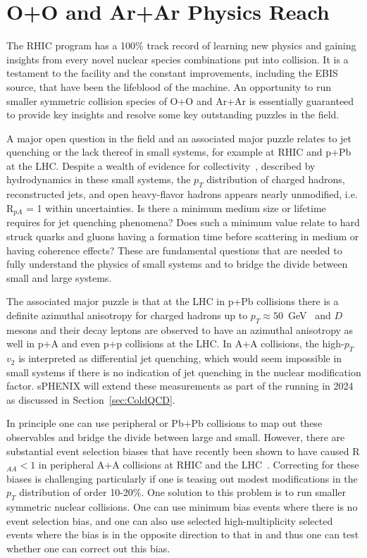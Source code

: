 \FloatBarrier

\section{O+O and Ar+Ar Physics Reach}

The RHIC program has a 100\% track record of learning new physics and gaining insights from every novel nuclear species combinations put into collision.    It is a testament to the facility and the constant improvements, including the EBIS source, that have been the lifeblood of the machine.    An opportunity to run smaller symmetric collision species of O+O and Ar+Ar is essentially guaranteed to provide key insights and resolve some key outstanding puzzles in the field.  

A major open question in the field and an associated major puzzle relates to jet quenching or the lack thereof in small systems, for example \pau at RHIC and p+Pb at the LHC.    Despite a wealth of evidence for collectivity~\cite{Nagle:2018nvi}, described by hydrodynamics in these small systems, the $p_{T}$ distribution of charged hadrons, reconstructed jets, and open heavy-flavor hadrons appears nearly unmodified, i.e. R$_{pA}$ = 1 within uncertainties.    Is there a minimum medium size or lifetime requires for jet quenching phenomena?   Does such a minimum value relate to hard struck quarks and gluons having a formation time before scattering in medium or having coherence effects?   These are fundamental questions that are needed to fully understand the physics of small systems and to bridge the divide between small and large systems.    

The associated major puzzle is that at the LHC in p+Pb collisions there is a definite azimuthal anisotropy for charged hadrons up to $p_{T} \approx 50$~GeV~\cite{Aad:2019ajj} and $D$ mesons and their decay leptons are observed to have an azimuthal anisotropy as well in p+A and even p+p collisions at the LHC.   In A+A collisions, the high-$p_T$ $v_{2}$ is interpreted as differential jet quenching, which would seem impossible in small systems if there is no indication of jet quenching in the nuclear modification factor.   sPHENIX will extend these measurements as part of the \pau running in 2024 as discussed in Section~\ref{sec:ColdQCD}.

In principle one can use peripheral \auau or Pb+Pb collisions to map out these observables and bridge the divide between large and small.   However, there are substantial event selection biases that have recently been shown to have caused R$_{AA} < 1$ in peripheral A+A collisions at RHIC and the LHC~\cite{Morsch:2017brb}.    Correcting for these biases is challenging particularly if one is teasing out modest modifications in the $p_{T}$ distribution of order 10-20\%.    One solution to this problem is to run smaller symmetric nuclear collisions.   One can use minimum bias events where there is no event selection bias, and one can also use selected high-multiplicity selected events where the bias is in the opposite direction to that in \auau and thus one can test whether one can correct out this bias.

